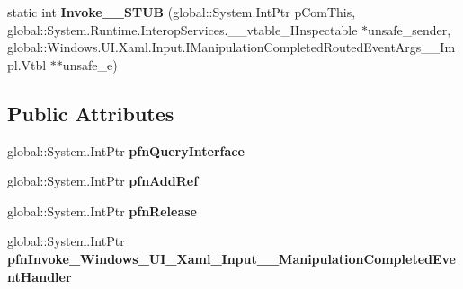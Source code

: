 \begin{DoxyCompactItemize}
\item 
\mbox{\label{struct_windows_1_1_u_i_1_1_xaml_1_1_input_1_1_manipulation_completed_event_handler_____impl_1_1_vtbl_aa8549f1e3e7afc5919e4f7e0687bdd54}} 
static int {\bfseries Invoke\+\_\+\+\_\+\+S\+T\+UB} (global\+::\+System.\+Int\+Ptr p\+Com\+This, global\+::\+System.\+Runtime.\+Interop\+Services.\+\_\+\+\_\+vtable\+\_\+\+I\+Inspectable $\ast$unsafe\+\_\+sender, global\+::\+Windows.\+U\+I.\+Xaml.\+Input.\+I\+Manipulation\+Completed\+Routed\+Event\+Args\+\_\+\+\_\+\+Impl.\+Vtbl $\ast$$\ast$unsafe\+\_\+e)
\end{DoxyCompactItemize}
\subsection*{Public Attributes}
\begin{DoxyCompactItemize}
\item 
\mbox{\label{struct_windows_1_1_u_i_1_1_xaml_1_1_input_1_1_manipulation_completed_event_handler_____impl_1_1_vtbl_a18705168b333758d766bb3902558009d}} 
global\+::\+System.\+Int\+Ptr {\bfseries pfn\+Query\+Interface}
\item 
\mbox{\label{struct_windows_1_1_u_i_1_1_xaml_1_1_input_1_1_manipulation_completed_event_handler_____impl_1_1_vtbl_aa9fcbaf167ddf9e9b70364a8535854bb}} 
global\+::\+System.\+Int\+Ptr {\bfseries pfn\+Add\+Ref}
\item 
\mbox{\label{struct_windows_1_1_u_i_1_1_xaml_1_1_input_1_1_manipulation_completed_event_handler_____impl_1_1_vtbl_a666457536c74f2081b1722ae4eccdfb5}} 
global\+::\+System.\+Int\+Ptr {\bfseries pfn\+Release}
\item 
\mbox{\label{struct_windows_1_1_u_i_1_1_xaml_1_1_input_1_1_manipulation_completed_event_handler_____impl_1_1_vtbl_adad08ac3fc5b6df57ddcff61a18d6d79}} 
global\+::\+System.\+Int\+Ptr {\bfseries pfn\+Invoke\+\_\+\+Windows\+\_\+\+U\+I\+\_\+\+Xaml\+\_\+\+Input\+\_\+\+\_\+\+Manipulation\+Completed\+Event\+Handler}
\end{DoxyCompactItemize}
